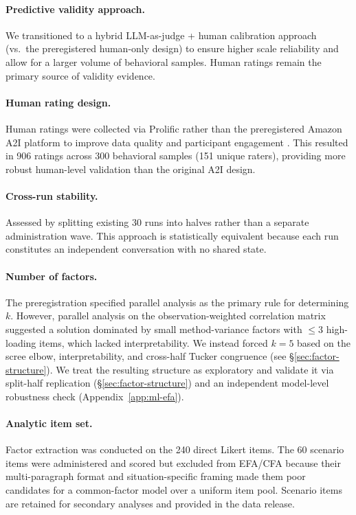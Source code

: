 \documentclass[11pt]{article}
\newcommand{\ndirect}{240}
\newcommand{\nscenario}{60}
\newcommand{\nfactors}{5}
\begin{document}
\paragraph{Predictive validity approach.}
We transitioned to a hybrid LLM-as-judge + human calibration approach (vs.\ the preregistered human-only design) to ensure higher scale reliability and allow for a larger volume of behavioral samples. Human ratings remain the primary source of validity evidence.

\paragraph{Human rating design.}
Human ratings were collected via Prolific rather than the preregistered Amazon A2I platform to improve data quality and participant engagement \citep{palan2018prolific,peer2022data}. This resulted in 906 ratings across 300 behavioral samples (151 unique raters), providing more robust human-level validation than the original A2I design.

\paragraph{Cross-run stability.}
Assessed by splitting existing 30 runs into halves rather than a separate administration wave.
This approach is statistically equivalent because each run constitutes an independent conversation with no shared state.

\paragraph{Number of factors.}
The preregistration specified parallel analysis as the primary rule for determining $k$. However, parallel analysis on the observation-weighted correlation matrix suggested a solution dominated by small method-variance factors with $\leq 3$ high-loading items, which lacked interpretability. We instead forced $k=\nfactors$ based on the scree elbow, interpretability, and cross-half Tucker congruence (see \S\ref{sec:factor-structure}). We treat the resulting structure as exploratory and validate it via split-half replication (\S\ref{sec:factor-structure}) and an independent model-level robustness check (Appendix~\ref{app:ml-efa}).

\paragraph{Analytic item set.}
Factor extraction was conducted on the \ndirect{} direct Likert items. The \nscenario{} scenario items were administered and scored but excluded from EFA/CFA because their multi-paragraph format and situation-specific framing made them poor candidates for a common-factor model over a uniform item pool. Scenario items are retained for secondary analyses and provided in the data release.
\end{document}
